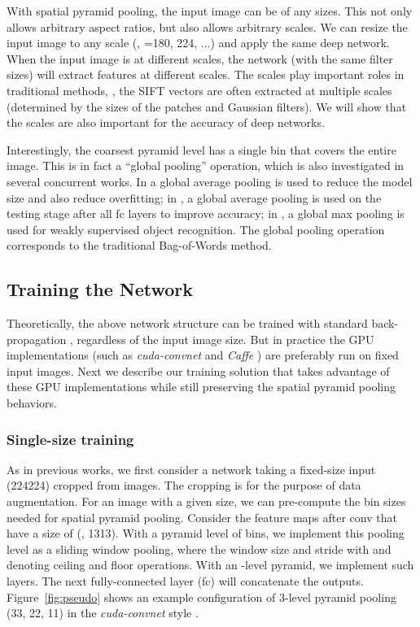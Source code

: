 \documentclass[10pt,journal,cspaper,compsoc]{IEEEtran}
\begin{document}
With spatial pyramid pooling, the input image can be of any sizes. This not only allows arbitrary aspect ratios, but also allows arbitrary scales. We can resize the input image to any scale (\eg, =180, 224, ...) and apply the same deep network. When the input image is at different scales, the network (with the same filter sizes) will extract features at different scales. The scales play important roles in traditional methods, \eg,
the SIFT vectors are often extracted at multiple scales \cite{Lowe2004,Chatfield2011} (determined by the sizes of the patches and Gaussian filters). We will show that the scales are also important for the accuracy of deep networks.

Interestingly, the coarsest pyramid level has a single bin that covers the entire image. This is in fact a ``global pooling'' operation, which is also investigated in several concurrent works. In \cite{Lin2013,Szegedy2014} a global average pooling is used to reduce the model size and also reduce overfitting; in \cite{Simonyan2014}, a global average pooling is used on the testing stage after all fc layers to improve accuracy; in \cite{Oquab2014}, a global max pooling is used for weakly supervised object recognition. The global pooling operation corresponds to the traditional Bag-of-Words method.

\subsection{Training the Network}

Theoretically, the above network structure can be trained with standard back-propagation \cite{LeCun1989}, regardless of the input image size. But in practice the GPU implementations (such as \emph{cuda-convnet} \cite{Krizhevsky2012} and \emph{Caffe} \cite{Jia2013}) are preferably run on fixed input images. Next we describe our training solution that takes advantage of these GPU implementations while still preserving the spatial pyramid pooling behaviors.

\subsubsection*{Single-size training}
As in previous works, we first consider a network taking a fixed-size input (224224) cropped from images. The cropping is for the purpose of data augmentation. For an image with a given size, we can pre-compute the bin sizes needed for spatial pyramid pooling. Consider the feature maps after conv that have a size of  (\eg, 1313). With a pyramid level of  bins, we implement this pooling level as a sliding window pooling, where the window size  and stride  with  and  denoting ceiling and floor operations. With an -level pyramid, we implement  such layers. The next fully-connected layer (fc) will concatenate the  outputs.
Figure~\ref{fig:pseudo} shows an example configuration of 3-level pyramid pooling (33, 22, 11) in the \emph{cuda-convnet} style \cite{Krizhevsky2012}.
\end{document}
